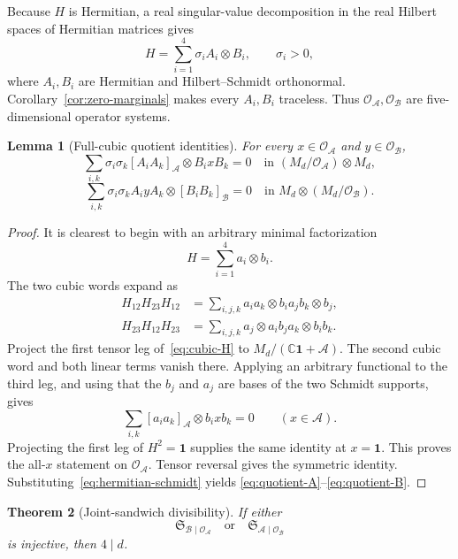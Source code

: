 \documentclass[11pt]{article}
\newtheorem{theorem}{Theorem}[section]
\newtheorem{lemma}[theorem]{Lemma}
\theoremstyle{definition}
\theoremstyle{remark}
\newcommand{\Id}{\mathbf 1}
\newcommand{\bbC}{\mathbb C}
\newcommand{\cA}{\mathcal A}
\newcommand{\cB}{\mathcal B}
\newcommand{\cO}{\mathcal O}
\newcommand{\cS}{\mathfrak S}
\begin{document}
Because \(H\) is Hermitian, a real singular-value decomposition in the
real Hilbert spaces of Hermitian matrices gives
\begin{equation}
 H=\sum_{i=1}^4\sigma_iA_i\otimes B_i,
 \qquad \sigma_i>0,
 \label{eq:hermitian-schmidt}
\end{equation}
where \(A_i,B_i\) are Hermitian and Hilbert--Schmidt orthonormal.
Corollary~\ref{cor:zero-marginals} makes every \(A_i,B_i\) traceless.
Thus \(\cO_{\cA},\cO_{\cB}\) are five-dimensional operator systems.

\begin{lemma}[Full-cubic quotient identities]\label{lem:quotient-identities}
For every \(x\in\cO_{\cA}\) and \(y\in\cO_{\cB}\),
\begin{equation}
 \sum_{i,k}\sigma_i\sigma_k
 [A_iA_k]_{\cA}\otimes B_i xB_k=0
 \quad\text{in }
 (M_d/\cO_{\cA})\otimes M_d,
 \label{eq:quotient-A}
\end{equation}
\begin{equation}
 \sum_{i,k}\sigma_i\sigma_k
 A_i yA_k\otimes[B_iB_k]_{\cB}=0
 \quad\text{in }
 M_d\otimes(M_d/\cO_{\cB}).
 \label{eq:quotient-B}
\end{equation}
\end{lemma}

\begin{proof}
It is clearest to begin with an arbitrary minimal factorization
\[
  H=\sum_{i=1}^4a_i\otimes b_i.
\]
The two cubic words expand as
\[
\begin{split}
 H_{12}H_{23}H_{12}
 &=\sum_{i,j,k}a_ia_k\otimes b_ia_jb_k\otimes b_j,\\
 H_{23}H_{12}H_{23}
 &=\sum_{i,j,k}a_j\otimes a_ib_ja_k\otimes b_ib_k.
\end{split}
\]
Project the first tensor leg of~\eqref{eq:cubic-H} to
\(M_d/(\bbC\Id+\cA)\). The second cubic word and both linear terms
vanish there. Applying an arbitrary functional to the third leg, and
using that the \(b_j\) and \(a_j\) are bases of the two Schmidt supports,
gives
\[
  \sum_{i,k}[a_ia_k]_{\cA}\otimes b_i x b_k=0
  \qquad(x\in\cA).
\]
Projecting the first leg of \(H^2=\Id\) supplies the same identity at
\(x=\Id\). This proves the all-\(x\) statement on
\(\cO_{\cA}\). Tensor reversal gives the symmetric identity.
Substituting~\eqref{eq:hermitian-schmidt} yields
\eqref{eq:quotient-A}--\eqref{eq:quotient-B}.
\end{proof}

\begin{theorem}[Joint-sandwich divisibility]\label{thm:sandwich}
If either
\[
  \cS_{\cB\mid\cO_{\cA}}
  \quad\text{or}\quad
  \cS_{\cA\mid\cO_{\cB}}
\]
is injective, then \(4\mid d\).
\end{theorem}
\end{document}
